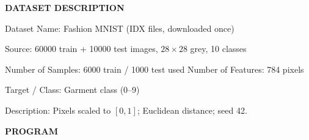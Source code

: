 \documentclass[11pt,twoside]{article}
\newcommand{\expheading}[1]{{\fontsize{14}{17}\selectfont\textbf{#1}\par}}
\begin{document}
{\expheading{DATASET DESCRIPTION}
\vspace{4pt}
\noindent Dataset Name: Fashion MNIST (IDX files, downloaded once)\par
\noindent Source: 60000 train + 10000 test images, $28\times28$ grey, 10 classes\par
\noindent Number of Samples: 6000 train / 1000 test used \hspace{0.3cm} Number of Features: 784 pixels\par
\noindent Target / Class: Garment class (0--9)\par
\noindent Description: Pixels scaled to $[0,1]$; Euclidean distance; seed 42. \par
\vspace{4pt}
} %

\newpage
\expheading{PROGRAM}
\vspace{6pt}
\end{document}
